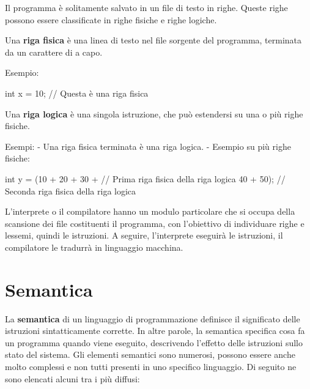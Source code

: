 \documentclass[
  letterpaper,
  DIV=11,
  numbers=noendperiod]{scrreprt}
\newenvironment{Shaded}{\begin{snugshade}}{\end{snugshade}}
\newcommand{\CommentTok}[1]{\textcolor[rgb]{0.37,0.37,0.37}{#1}}
\newcommand{\DataTypeTok}[1]{\textcolor[rgb]{0.68,0.00,0.00}{#1}}
\newcommand{\DecValTok}[1]{\textcolor[rgb]{0.68,0.00,0.00}{#1}}
\newcommand{\NormalTok}[1]{\textcolor[rgb]{0.00,0.23,0.31}{#1}}
\newcommand{\OperatorTok}[1]{\textcolor[rgb]{0.37,0.37,0.37}{#1}}
\begin{document}
Il programma è solitamente salvato in un file di testo in righe. Queste
righe possono essere classificate in righe fisiche e righe logiche.

Una \textbf{riga fisica} è una linea di testo nel file sorgente del
programma, terminata da un carattere di a capo.

Esempio:

\begin{Shaded}
\begin{Highlighting}[]
\DataTypeTok{int}\NormalTok{ x }\OperatorTok{=} \DecValTok{10}\OperatorTok{;} \CommentTok{// Questa è una riga fisica}
\end{Highlighting}
\end{Shaded}

Una \textbf{riga logica} è una singola istruzione, che può estendersi su
una o più righe fisiche.

Esempi: - Una riga fisica terminata è una riga logica. - Esempio su più
righe fisiche:

\begin{Shaded}
\begin{Highlighting}[]
\DataTypeTok{int}\NormalTok{ y }\OperatorTok{=} \OperatorTok{(}\DecValTok{10} \OperatorTok{+} \DecValTok{20} \OperatorTok{+} \DecValTok{30} \OperatorTok{+} \CommentTok{// Prima riga fisica della riga logica}
         \DecValTok{40} \OperatorTok{+} \DecValTok{50}\OperatorTok{);} \CommentTok{// Seconda riga fisica della riga logica}
\end{Highlighting}
\end{Shaded}

L'interprete o il compilatore hanno un modulo particolare che si occupa
della scansione dei file costituenti il programma, con l'obiettivo di
individuare righe e lessemi, quindi le istruzioni. A seguire,
l'interprete eseguirà le istruzioni, il compilatore le tradurrà in
linguaggio macchina.

\section{Semantica}\label{semantica}

La \textbf{semantica} di un linguaggio di programmazione definisce il
significato delle istruzioni sintatticamente corrette. In altre parole,
la semantica specifica cosa fa un programma quando viene eseguito,
descrivendo l'effetto delle istruzioni sullo stato del sistema. Gli
elementi semantici sono numerosi, possono essere anche molto complessi e
non tutti presenti in uno specifico linguaggio. Di seguito ne sono
elencati alcuni tra i più diffusi:
\end{document}

